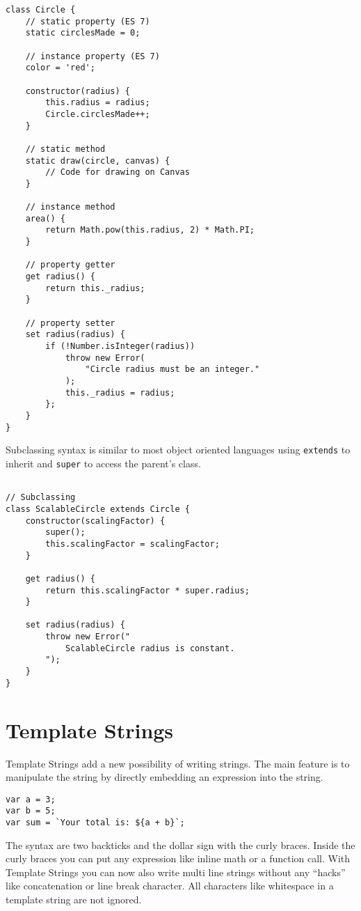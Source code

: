 \documentclass{bioinfo}
\begin{document}
\begin{lstlisting}
class Circle {
    // static property (ES 7)
    static circlesMade = 0;

    // instance property (ES 7)
    color = 'red';

    constructor(radius) {
        this.radius = radius;
        Circle.circlesMade++;
    }

    // static method
    static draw(circle, canvas) {
        // Code for drawing on Canvas
    }

    // instance method
    area() {
        return Math.pow(this.radius, 2) * Math.PI;
    }

    // property getter
    get radius() {
        return this._radius;
    }

    // property setter
    set radius(radius) {
        if (!Number.isInteger(radius))
            throw new Error(
                "Circle radius must be an integer."
            );
            this._radius = radius;
        };
    }
}

\end{lstlisting}

Subclassing syntax is similar to most object oriented
languages using {\tt extends} to inherit and {\tt super}
to access the parent's class.

\vfill\break

\begin{lstlisting}

// Subclassing
class ScalableCircle extends Circle {
    constructor(scalingFactor) {
        super();
        this.scalingFactor = scalingFactor;
    }

    get radius() {
        return this.scalingFactor * super.radius;
    }

    set radius(radius) {
        throw new Error("
            ScalableCircle radius is constant.
        ");
    }
}
\end{lstlisting}

\section{Template Strings}
Template Strings add a new possibility of writing strings.
The main feature is to manipulate the string by
directly embedding an expression into the string.

\begin{lstlisting}
var a = 3;
var b = 5;
var sum = `Your total is: ${a + b}`;
\end{lstlisting}
The syntax are two backticks and the dollar sign with the curly braces.
Inside the curly braces you can put any expression like inline math or a function call.
With Template Strings you can now also write multi line strings without any ``hacks'' like
concatenation or line break character. All characters like whitespace in a template string
are not ignored.
\end{document}
